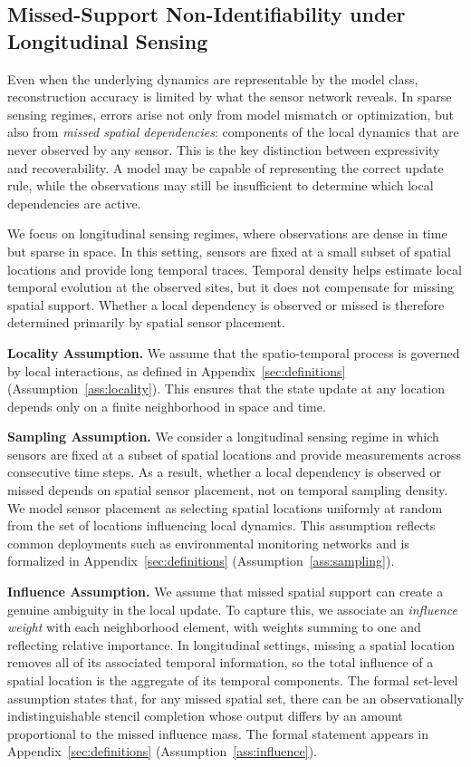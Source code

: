\subsection{Missed-Support Non-Identifiability under Longitudinal Sensing}

Even when the underlying dynamics are representable by the model class, reconstruction accuracy is limited by what the sensor network reveals. In sparse sensing regimes, errors arise not only from model mismatch or optimization, but also from \emph{missed spatial dependencies}: components of the local dynamics that are never observed by any sensor. This is the key distinction between expressivity and recoverability. A model may be capable of representing the correct update rule, while the observations may still be insufficient to determine which local dependencies are active.

We focus on longitudinal sensing regimes, where observations are dense in time but sparse in space. In this setting, sensors are fixed at a small subset of spatial locations and provide long temporal traces. Temporal density helps estimate local temporal evolution at the observed sites, but it does not compensate for missing spatial support. Whether a local dependency is observed or missed is therefore determined primarily by spatial sensor placement.

\noindent\textbf{Locality Assumption.}
We assume that the spatio-temporal process is governed by local interactions, as defined in Appendix~\ref{sec:definitions} (Assumption~\ref{ass:locality}). This ensures that the state update at any location depends only on a finite neighborhood in space and time.

\noindent\textbf{Sampling Assumption.}
We consider a longitudinal sensing regime in which sensors are fixed at a subset of spatial locations and provide measurements across consecutive time steps. As a result, whether a local dependency is observed or missed depends on spatial sensor placement, not on temporal sampling density. We model sensor placement as selecting spatial locations uniformly at random from the set of locations influencing local dynamics. This assumption reflects common deployments such as environmental monitoring networks and is formalized in Appendix~\ref{sec:definitions} (Assumption~\ref{ass:sampling}).

\noindent\textbf{Influence Assumption.}
We assume that missed spatial support can create a genuine ambiguity in the local update. To capture this, we associate an \emph{influence weight} with each neighborhood element, with weights summing to one and reflecting relative importance. In longitudinal settings, missing a spatial location removes all of its associated temporal information, so the total influence of a spatial location is the aggregate of its temporal components. The formal set-level assumption states that, for any missed spatial set, there can be an observationally indistinguishable stencil completion whose output differs by an amount proportional to the missed influence mass. The formal statement appears in Appendix~\ref{sec:definitions} (Assumption~\ref{ass:influence}).

